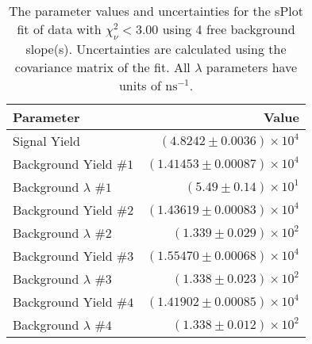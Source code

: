 
\begin{table}
    \begin{center}
        \begin{tabular}{lr}\toprule
            Parameter & Value \\\midrule
            Signal Yield & $(4.8242 \pm 0.0036) \times 10^{4}$ \\
            Background Yield $\#1$ & $(1.41453 \pm 0.00087) \times 10^{4}$ \\
            Background $\lambda$ $\#1$ & $(5.49 \pm 0.14) \times 10^{1}$ \\
            Background Yield $\#2$ & $(1.43619 \pm 0.00083) \times 10^{4}$ \\
            Background $\lambda$ $\#2$ & $(1.339 \pm 0.029) \times 10^{2}$ \\
            Background Yield $\#3$ & $(1.55470 \pm 0.00068) \times 10^{4}$ \\
            Background $\lambda$ $\#3$ & $(1.338 \pm 0.023) \times 10^{2}$ \\
            Background Yield $\#4$ & $(1.41902 \pm 0.00085) \times 10^{4}$ \\
            Background $\lambda$ $\#4$ & $(1.338 \pm 0.012) \times 10^{2}$ \\\bottomrule
        \end{tabular}
        \caption{The parameter values and uncertainties for the sPlot fit of data with $\chi^2_\nu < 3.00$ using 4 free background slope(s). Uncertainties are calculated using the covariance matrix of the fit. All $\lambda$ parameters have units of $\si{\nano\second}^{-1}$.}
    \end{center}
\end{table}
